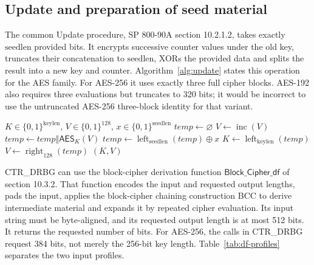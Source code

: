 \documentclass[journal=tosc,preprint,floatrow,nohyperxmp]{iacrtrans}
\numberwithin{lemma}{section}
\numberwithin{proposition}{section}
\newcommand{\bits}{\{0,1\}}
\newcommand{\Enc}{\mathsf{AES}}
\newcommand{\DF}{\ensuremath{\mathsf{Block\_Cipher\_df}}}
\numberwithin{equation}{section}
\theoremstyle{definition}
\numberwithin{definition}{section}
\theoremstyle{plain}
\begin{document}
\subsection{Update and preparation of seed material}
The common Update procedure, SP 800-90A section 10.2.1.2, takes exactly $\mathrm{seedlen}$ provided bits. It encrypts successive counter values under the old key, truncates their concatenation to $\mathrm{seedlen}$, XORs the provided data and splits the result into a new key and counter. Algorithm~\ref{alg:update} states this operation for the AES family. For AES-256 it uses exactly three full cipher blocks. AES-192 also requires three evaluations but truncates to 320 bits; it would be incorrect to use the untruncated AES-256 three-block identity for that variant.

\begin{algorithm}[htbp]
\caption{CTR\_DRBG Update for an AES variant}\label{alg:update}
\begin{algorithmic}[1]
\Require $K\in\bits^{\mathrm{keylen}}$, $V\in\bits^{128}$, $x\in\bits^{\mathrm{seedlen}}$
\State $\mathit{temp}\gets\varnothing$
  \State $V\gets\operatorname{inc}(V)$
  \State $\mathit{temp}\gets\mathit{temp}\Vert\Enc_K(V)$
\EndWhile
\State $\mathit{temp}\gets\operatorname{left}_{\mathrm{seedlen}}(\mathit{temp})\oplus x$
\State $K\gets\operatorname{left}_{\mathrm{keylen}}(\mathit{temp})$
\State $V\gets\operatorname{right}_{128}(\mathit{temp})$
\State \Return $(K,V)$
\end{algorithmic}
\end{algorithm}

CTR\_DRBG can use the block-cipher derivation function $\DF$ of section 10.3.2. That function encodes the input and requested output lengths, pads the input, applies the block-cipher chaining construction BCC to derive intermediate material and expands it by repeated cipher evaluation. Its input string must be byte-aligned, and its requested output length is at most 512 bits. It returns the requested number of bits. For AES-256, the calls in CTR\_DRBG request 384 bits, not merely the 256-bit key length. Table~\ref{tab:df-profiles} separates the two input profiles.
\end{document}
